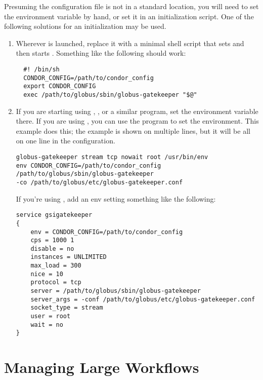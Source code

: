 Presuming the configuration file is not in a standard location,
you will need to set the  environment variable
by hand, or set it in an initialization script.
One of the following solutions for an initialization may be used.
\begin{enumerate}
\item 
Wherever  is launched,
replace it with a minimal shell script that sets
 and then starts .
Something like the following should work:

\footnotesize
\begin{verbatim}
  #! /bin/sh
  CONDOR_CONFIG=/path/to/condor_config
  export CONDOR_CONFIG
  exec /path/to/globus/sbin/globus-gatekeeper "$@"
\end{verbatim}
\normalsize
\item 
If you are starting  using ,
, or a similar program,
set the environment variable there.
If you are using , you can use the  program
to set the environment.
This example does this;
the example is shown on multiple lines,
but it will be all on one line in the  configuration. 
\footnotesize
\begin{verbatim}
globus-gatekeeper stream tcp nowait root /usr/bin/env
env CONDOR_CONFIG=/path/to/condor_config
/path/to/globus/sbin/globus-gatekeeper
-co /path/to/globus/etc/globus-gatekeeper.conf
\end{verbatim}
\normalsize
If you're using , add an env setting
something like the following:
\footnotesize
\begin{verbatim}
service gsigatekeeper
{
    env = CONDOR_CONFIG=/path/to/condor_config
    cps = 1000 1
    disable = no
    instances = UNLIMITED
    max_load = 300
    nice = 10
    protocol = tcp
    server = /path/to/globus/sbin/globus-gatekeeper
    server_args = -conf /path/to/globus/etc/globus-gatekeeper.conf
    socket_type = stream
    user = root
    wait = no
}
\end{verbatim}
\normalsize

\end{enumerate}

\section{Managing Large Workflows}

